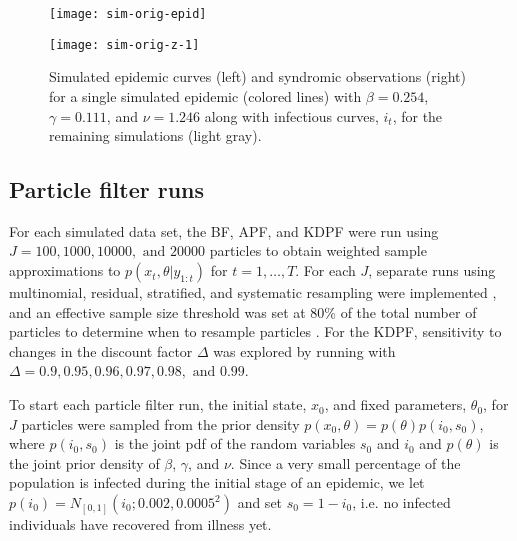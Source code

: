 \documentclass{elsarticle}
\begin{document}
\begin{figure}
\centering
\begin{minipage}{0.48\linewidth}
\texttt{[image: sim-orig-epid]}
\end{minipage}
\begin{minipage}{0.48\linewidth}
\texttt{[image: sim-orig-z-1]}
\end{minipage}
\caption{Simulated epidemic curves (left) and syndromic observations (right) for a single simulated epidemic (colored lines) with $\beta = 0.254$, $\gamma = 0.111$, and $\nu = 1.246$ along with infectious curves, $i_t$, for the remaining simulations (light gray).} \label{fig:data}
\end{figure}

\subsection{Particle filter runs} \label{sec:pf}

For each simulated data set, the BF, APF, and KDPF were run using $J = 100, 1000, 10000, \mbox{ and } 20000$ particles to obtain weighted sample approximations to $p(x_t,\theta|y_{1:t})$ for $t = 1,\ldots,T$. For each $J$, separate runs using multinomial, residual, stratified, and systematic resampling were implemented \citep{smcUtils}, and an effective sample size threshold was set at 80\% of the total number of particles to determine when to resample particles \citep{Liu:Chen:Wong:reje:1998}. For the KDPF, sensitivity to changes in the discount factor $\Delta$ was explored by running with $\Delta = 0.9, 0.95, 0.96, 0.97, 0.98, \mbox{ and } 0.99$.

To start each particle filter run, the initial state, $x_0$, and fixed parameters, $\theta_0$, for $J$ particles were sampled from the prior density $p(x_0,\theta) = p(\theta)p(i_0,s_0)$, where $p(i_0,s_0)$ is the joint pdf of the random variables $s_0$ and $i_0$ and $p(\theta)$ is the joint prior density of $\beta$, $\gamma$, and $\nu$. Since a very small percentage of the population is infected during the initial stage of an epidemic, we let $p(i_0) = N_{[0,1]}(i_0;0.002,0.0005^2)$ and set $s_0 = 1 - i_0$, i.e. no infected individuals have recovered from illness yet.
\end{document}
